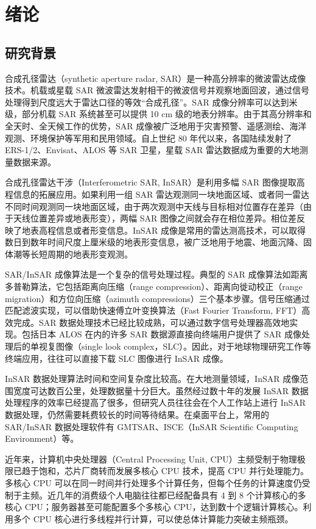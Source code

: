 \chapter{绪论}


\section{研究背景}

合成孔径雷达（synthetic aperture radar, SAR）是一种高分辨率的微波雷达成像技术。机载或星载 SAR 微波雷达发射相干的微波信号并观察地面回波，通过信号处理得到尺度远大于雷达口径的等效“合成孔径”。SAR 成像分辨率可以达到米级，部分机载 SAR 系统甚至可以提供 10 cm 级的地表分辨率\cite{cantalloube2006airborne}。由于其高分辨率和全天时、全天候工作的优势，SAR 成像被广泛地用于灾害预警、遥感测绘、海洋观测、环境保护等军用和民用领域。自上世纪 80 年代以来，各国陆续发射了 ERS-1/2、Envisat、ALOS 等 SAR 卫星，星载 SAR 雷达数据成为重要的大地测量数据来源。

合成孔径雷达干涉（Interferometric SAR, InSAR）是利用多幅 SAR 图像提取高程信息的拓展应用。如果利用一组 SAR 雷达观测同一块地面区域、或者同一雷达不同时间观测同一块地面区域，由于两次观测中天线与目标相对位置存在差异（由于天线位置差异或地表形变），两幅 SAR 图像之间就会存在相位差异。相位差反映了地表高程信息或者形变信息。InSAR 成像是常用的雷达测高技术，可以取得数日到数年时间尺度上厘米级的地表形变信息，被广泛地用于地震、地面沉降、固体潮等长短周期的地表形变观测。

SAR/InSAR 成像算法是一个复杂的信号处理过程。典型的 SAR 成像算法如距离多普勒算法，它包括距离向压缩（range compression）、距离向徙动校正（range migration）和方位向压缩（azimuth compressions）三个基本步骤。信号压缩通过匹配滤波实现，可以借助快速傅立叶变换算法（Fast Fourier Transform, FFT）高效完成。SAR 数据处理技术已经比较成熟，可以通过数字信号处理器高效地实现\cite{curlander2006sar}。包括日本 ALOS 在内的许多 SAR 数据源直接向终端用户提供了 SAR 成像处理后的单视复图像（single look complex，SLC）。因此，对于地球物理研究工作等终端应用，往往可以直接下载 SLC 图像进行 InSAR 成像。

InSAR 数据处理算法时间和空间复杂度比较高。在大地测量领域，InSAR 成像范围宽度可达数百公里，处理数据量十分巨大。虽然经过数十年的发展 InSAR 数据处理程序的效率已经提高了很多，但研究人员往往会在个人工作站上进行 InSAR 数据处理，仍然需要耗费较长的时间等待结果。在桌面平台上，常用的 SAR/InSAR 数据处理软件有 GMTSAR\cite{web:gmtsar}、ISCE（InSAR Scientific Computing Environment）\cite{web:isce}等。

近年来，计算机中央处理器（Central Processing Unit, CPU）主频受制于物理极限已趋于饱和，芯片厂商转而发展多核心 CPU 技术，提高 CPU 并行处理能力。多核心 CPU 可以在同一时间并行处理多个计算任务，但每个任务的计算速度仍受制于主频。近几年的消费级个人电脑往往都已经配备具有 4 到 8 个计算核心的多核心 CPU；服务器甚至可能配置多个多核心 CPU，达到数十个逻辑计算核心。利用多个 CPU 核心进行多线程并行计算，可以使总体计算能力突破主频瓶颈。

